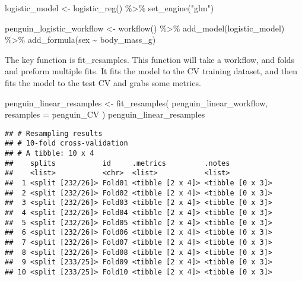 \documentclass[
]{article}
\newenvironment{Shaded}{\begin{snugshade}}{\end{snugshade}}
\newcommand{\AttributeTok}[1]{\textcolor[rgb]{0.77,0.63,0.00}{#1}}
\newcommand{\FunctionTok}[1]{\textcolor[rgb]{0.00,0.00,0.00}{#1}}
\newcommand{\NormalTok}[1]{#1}
\newcommand{\OtherTok}[1]{\textcolor[rgb]{0.56,0.35,0.01}{#1}}
\newcommand{\SpecialCharTok}[1]{\textcolor[rgb]{0.00,0.00,0.00}{#1}}
\newcommand{\StringTok}[1]{\textcolor[rgb]{0.31,0.60,0.02}{#1}}
\begin{document}
\begin{Shaded}
\begin{Highlighting}[]
\NormalTok{logistic\_model }\OtherTok{\textless{}{-}} \FunctionTok{logistic\_reg}\NormalTok{() }\SpecialCharTok{\%\textgreater{}\%} 
  \FunctionTok{set\_engine}\NormalTok{(}\StringTok{"glm"}\NormalTok{)}

\NormalTok{penguin\_logistic\_workflow }\OtherTok{\textless{}{-}} \FunctionTok{workflow}\NormalTok{() }\SpecialCharTok{\%\textgreater{}\%} 
  \FunctionTok{add\_model}\NormalTok{(logistic\_model) }\SpecialCharTok{\%\textgreater{}\%} 
  \FunctionTok{add\_formula}\NormalTok{(sex }\SpecialCharTok{\textasciitilde{}}\NormalTok{ body\_mass\_g)}
\end{Highlighting}
\end{Shaded}

The key function is fit\_resamples. This function will take a workflow,
and folds and preform multiple fits. It fits the model to the CV
training dataset, and then fits the model to the test CV and grabs some
metrics.

\begin{Shaded}
\begin{Highlighting}[]
\NormalTok{penguin\_linear\_resamples }\OtherTok{\textless{}{-}} \FunctionTok{fit\_resamples}\NormalTok{( }
\NormalTok{  penguin\_linear\_workflow, }
  \AttributeTok{resamples =}\NormalTok{ penguin\_CV ) }
\NormalTok{penguin\_linear\_resamples}
\end{Highlighting}
\end{Shaded}

\begin{verbatim}
## # Resampling results
## # 10-fold cross-validation 
## # A tibble: 10 x 4
##    splits           id     .metrics         .notes          
##    <list>           <chr>  <list>           <list>          
##  1 <split [232/26]> Fold01 <tibble [2 x 4]> <tibble [0 x 3]>
##  2 <split [232/26]> Fold02 <tibble [2 x 4]> <tibble [0 x 3]>
##  3 <split [232/26]> Fold03 <tibble [2 x 4]> <tibble [0 x 3]>
##  4 <split [232/26]> Fold04 <tibble [2 x 4]> <tibble [0 x 3]>
##  5 <split [232/26]> Fold05 <tibble [2 x 4]> <tibble [0 x 3]>
##  6 <split [232/26]> Fold06 <tibble [2 x 4]> <tibble [0 x 3]>
##  7 <split [232/26]> Fold07 <tibble [2 x 4]> <tibble [0 x 3]>
##  8 <split [232/26]> Fold08 <tibble [2 x 4]> <tibble [0 x 3]>
##  9 <split [233/25]> Fold09 <tibble [2 x 4]> <tibble [0 x 3]>
## 10 <split [233/25]> Fold10 <tibble [2 x 4]> <tibble [0 x 3]>
\end{verbatim}
\end{document}
